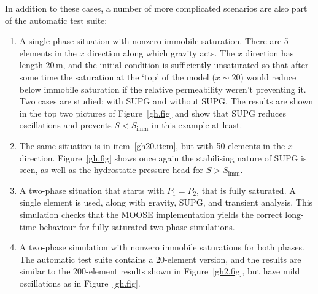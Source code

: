 \documentclass[]{scrreprt}
\begin{document}
\noindent In addition to these cases, a number of more complicated scenarios are
also part of the automatic test suite:
\begin{enumerate}
\item\label{gh20.item} A single-phase situation with nonzero immobile saturation.
  There are 5 elements in the $x$ direction along which gravity acts.
  The $x$ direction has length 20\,m, and the initial condition is
  sufficiently unsaturated so that after some time the saturation at
  the `top' of the model ($x\sim 20$) would reduce below immobile
  saturation if the relative permeability weren't preventing it.  Two
  cases are studied: with SUPG and without SUPG.  The results are
  shown in the top two pictures of Figure~\ref{gh.fig} and show that
  SUPG reduces oscillations and prevents $S<S_{\mathrm{imm}}$ in this
  example at least.
\item The same situation is in item~\ref{gh20.item}, but with 50
  elements in the $x$ direction.  Figure~\ref{gh.fig} shows once again
  the stabilising nature of SUPG is seen, as well as the hydrostatic
  pressure head for $S>S_{\mathrm{imm}}$.
\item A two-phase situation that starts with $P_{1}=P_{2}$, that is
  fully saturated.  A single element is used, along with gravity,
  SUPG, and transient analysis.  This simulation checks that the MOOSE
  implementation yields the correct long-time behaviour for
  fully-saturated two-phase simulations.
\item A two-phase simulation with nonzero immobile saturations for
  both phases.  The automatic test suite contains a 20-element
  version, and the results are similar to the 200-element results
  shown in Figure~\ref{gh2.fig}, but have mild oscillations as in
  Figure~\ref{gh.fig}.

\end{enumerate}
\end{document}
